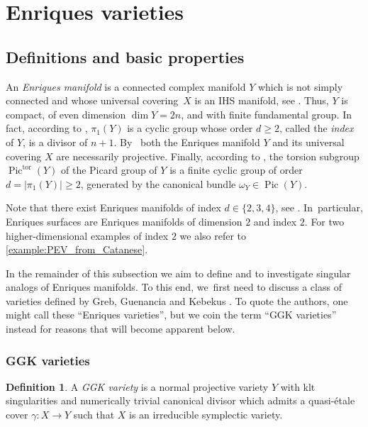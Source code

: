 \documentclass[10pt]{amsart}
\let\Subsubsection\subsubsection
\theoremstyle{plain}
\theoremstyle{definition}
\newtheorem{dfn}[thm]{Definition}
\DeclareMathOperator{\Pic}{Pic}
\begin{document}
\section{Enriques varieties}
\label{section:Enriques_varieties}

\subsection{Definitions and basic properties}
\label{subsection:def_Enriques}

An \emph{Enriques manifold} is a connected complex manifold $Y$ which is not simply connected and whose universal covering~$X$ is an IHS manifold, see \cite[Def.\,2.1]{OS11a}. Thus, $Y$ is compact, of even dimension \hbox{$\dim Y = 2n$}, and with finite fundamental group.
In fact, according to \cite[Prop.\,2.4]{OS11a}, $\pi_1(Y)$ is a cyclic group whose order $d \geq 2$, called the \emph{index} of $Y$, is a divisor of $n+1$. By~\cite[Cor.\,2.7]{OS11a} both the Enriques manifold $Y$ and its universal covering $X$ are necessarily projective. Finally, according to \cite[Prop.\,2.8]{OS11a}, the torsion subgroup $\Pic^{\text{tor}}(Y)$ of the Picard group of $Y$ is a finite cyclic group of order $d = |\pi_1(Y)| \geq 2$, generated by the canonical bundle $\omega_Y \in \Pic(Y)$.

Note that there exist Enriques manifolds of index $d \in \{2, 3, 4\}$, see \cite{BNWS11,OS11a}. In~particular, Enriques surfaces are Enriques manifolds of dimension $2$ and index $2$. For two higher-dimensional examples of index $2$ we also refer to \autoref{example:PEV_from_Catanese}.

In the remainder of this subsection we aim to define and to investigate singular analogs of Enriques manifolds. To this end, we~first need to discuss a class of varieties defined by Greb, Guenancia and Kebekus \cite[Rem.\,13.5]{GGK19}. To quote the authors, one might call these \enquote{Enriques varieties}, but we coin the term \enquote{GGK varieties} instead for reasons that will become apparent below.

\Subsubsection{GGK varieties}

\begin{dfn}
\label{dfn:GGK_variety}
A \emph{GGK variety} is a normal projective variety $Y$ with klt singularities and numerically trivial canonical divisor which admits a quasi-étale cover $\gamma \colon X \to Y$ such that $X$ is an irreducible symplectic variety.
\end{dfn}
\end{document}
